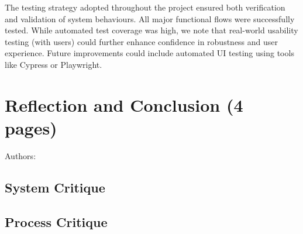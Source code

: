 \documentclass[12pt,a4paper]{article}
\begin{document}
The testing strategy adopted throughout the project ensured both verification and validation of system behaviours. All major functional flows were successfully tested. While automated test coverage was high, we note that real-world usability testing (with users) could further enhance confidence in robustness and user experience. Future improvements could include automated UI testing using tools like Cypress or Playwright.

\newpage








\section{Reflection and Conclusion (4 pages)}
Authors:
\label{sec:reflection}
\subsection{System Critique}

\subsection{Process Critique}


\newpage
\end{document}

